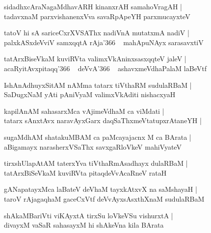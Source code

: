 \documentclass[twoside,12pt,openright]{book}
\newcounter{shloka}[chapter]
\begin{document}
\begin{shloka}
sidadhxcAraNagaMdhavARH kinanxrAH samahoVragAH |\\
tadavxnaM parxvishanenxVva savaRpApeYH parxmucayxteV 
\end{shloka}

\begin{shloka}
tatoV hi sA sariceCxrXVSAThx nadiVnA mutatxmA nadiV |\\
palxkASxdeVviV samxqqtA rAja\char'366 ~ mahApuNAyx sarasavxtiV 
\end{shloka}

\begin{shloka}
tatArxBiseVkaM kuviRVta valimxVkAninxsasxqqteV jaleV |\\
acaRyitAvxpitaqq\char'366 ~ deVvA\char'366 ~ ashavxmeVdhaPalaM laBeVtf 
\end{shloka}

\begin{shloka}
IshAnAdhuyxSitAM nAMma tatarx tiVthaRM sudulaRBaM |\\
SaDugxNaM yAti pAniVyaM valimxVkAditi nishacxyaH 
\end{shloka}

\begin{shloka}
kapilAnAM sahasarxMca vAjimeVdhaM ca viMdati |\\
tatarx sAnxtAvx naravAyxGarx daqSaThxmeVtatupxrAtaneYH |\\
\end{shloka}

\begin{shloka}
sugaMdhAM shatakuMBAM ca paMcayajacnx M ca BArata |\\
aBigamayx narasherxVSaThx savxgaRloVkeV mahiVyateV 
\end{shloka}

\begin{shloka}
tirxshUlapAtAM taterxYva tiVthaRmAsadhayx dulaRBaM |\\
tatArxBiSeVkaM kuviRVta pitaqdeVvAcaRneV rataH  
\end{shloka}

\begin{shloka}
gANapatayxMca laBateV deVhaM tayxkAtxvX na saMshayaH |\\
taroV rAjagaqhaM gaceCxVtf deVvAyxsAsxthXnaM sudulaRBaM 
\end{shloka}

\begin{shloka}
shAkaMBariVti viKAyxtA tirxSu loVkeVSu vishurxtA |\\
divayxM vaSaR sahasayxM hi shAkeVna kila BArata 
\end{shloka}
\end{document}
